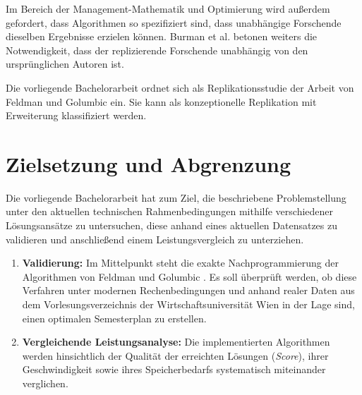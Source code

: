 Im Bereich der Management-Mathematik und Optimierung wird außerdem gefordert, dass Algorithmen so spezifiziert sind, dass unabhängige Forschende dieselben Ergebnisse erzielen können. Burman et al. \cite{burman-2010} betonen weiters die Notwendigkeit, dass der replizierende Forschende unabhängig von den ursprünglichen Autoren ist.


Die vorliegende Bachelorarbeit ordnet sich als Replikationsstudie der Arbeit von Feldman und Golumbic \cite{feldmangolumbic} ein. Sie kann als konzeptionelle Replikation mit Erweiterung klassifiziert werden.




\section{Zielsetzung und Abgrenzung}\label{chap:zielsetzung_abgrenzung}


Die vorliegende Bachelorarbeit hat zum Ziel, die beschriebene Problemstellung unter den aktuellen technischen Rahmenbedingungen mithilfe verschiedener Lösungsansätze zu untersuchen, diese anhand eines aktuellen Datensatzes zu validieren und anschließend einem Leistungsvergleich zu unterziehen.

\begin{enumerate}
  \item \textbf{Validierung:} Im Mittelpunkt steht die exakte Nachprogrammierung der Algorithmen von Feldman und Golumbic \cite{feldmangolumbic}. Es soll überprüft werden, ob diese Verfahren unter modernen Rechenbedingungen und anhand realer Daten aus dem Vorlesungsverzeichnis der Wirtschaftsuniversität Wien in der Lage sind, einen optimalen Semesterplan zu erstellen.
  \item \textbf{Vergleichende Leistungsanalyse:} Die implementierten Algorithmen werden hinsichtlich der Qualität der erreichten Lösungen (\textit{Score}), ihrer Geschwindigkeit sowie ihres Speicherbedarfs systematisch miteinander verglichen.
\end{enumerate}




